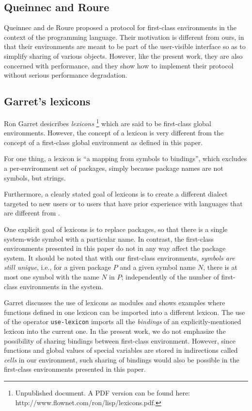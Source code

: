 \subsection{Queinnec and Roure}

Queinnec and de Roure \cite{Queinnec:1996:SCT:232627.232653} proposed
a protocol for first-class environments in the context of the
\scheme{} programming language.  Their motivation is different from
ours, in that their environments are meant to be part of the
user-visible interface so as to simplify sharing of various objects.
However, like the present work, they are also concerned with
performance, and they show how to implement their protocol without
serious performance degradation.

\subsection{Garret's lexicons}

Ron Garret desicribes \emph{lexicons}%
\footnote{Unpublished document.  A PDF version can be found here:
  http://www.flownet.com/ron/lisp/lexicons.pdf.}
which are said to be first-class global environments.  However, the
concept of a lexicon is very different from the concept of a
first-class global environment as defined in this paper.

For one thing, a lexicon is ``a mapping from symbols to bindings'',
which excludes a per-environment set of packages, simply because
package names are not symbols, but strings.

Furthermore, a clearly stated goal of lexicons is to create a
different \lisp{} dialect targeted to new users or to users that have
prior experience with languages that are different from \lisp{}.

One explicit goal of lexicons is to replace \commonlisp{} packages, so
that there is a single system-wide symbol with a particular name.  In
contrast, the first-class environments presented in this paper do not
in any way affect the package system.  It should be noted that with
our first-class environments, \emph{symbols are still unique}, i.e.,
for a given package $P$ and a given symbol name $N$, there is at most
one symbol with the name $N$ in $P$; independently of the number of
first-class environments in the system.

Garret discusses the use of lexicons as modules and shows examples
where functions defined in one lexicon can be imported into a
different lexicon.  The use of the operator \texttt{use-lexicon}
imports all the \emph{bindings} of an explicitly-mentioned lexicon
into the current one.  In the present work, we do not emphasize the
possibility of sharing bindings between first-class environment.
However, since functions and global values of special variables are
stored in indirections called \emph{cells} in our environment, such
sharing of bindings would also be possible in the first-class
environments presented in this paper.
